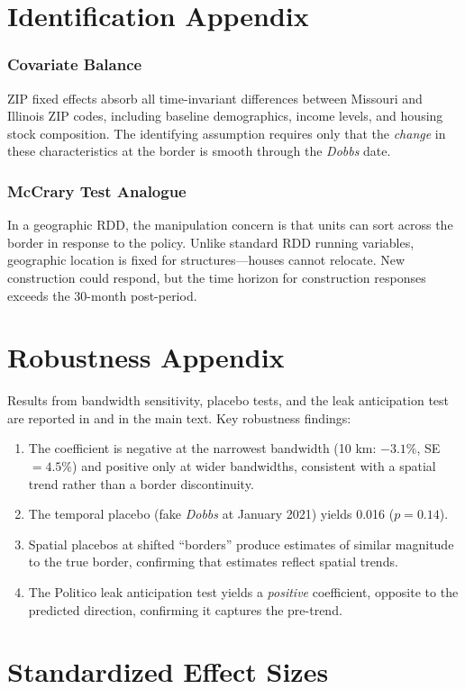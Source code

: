 \documentclass[12pt]{article}
\begin{document}
\section{Identification Appendix}
\label{app:identification}

\subsubsection*{Covariate Balance} ZIP fixed effects absorb all time-invariant differences between Missouri and Illinois ZIP codes, including baseline demographics, income levels, and housing stock composition. The identifying assumption requires only that the \textit{change} in these characteristics at the border is smooth through the \textit{Dobbs} date.

\subsubsection*{McCrary Test Analogue} In a geographic RDD, the manipulation concern is that units can sort across the border in response to the policy. Unlike standard RDD running variables, geographic location is fixed for structures---houses cannot relocate. New construction could respond, but the time horizon for construction responses exceeds the 30-month post-period.

\section{Robustness Appendix}

Results from bandwidth sensitivity, placebo tests, and the leak anticipation test are reported in  and  in the main text. Key robustness findings:

\begin{enumerate}
\item The coefficient is negative at the narrowest bandwidth (10 km: $-3.1\%$, SE $= 4.5\%$) and positive only at wider bandwidths, consistent with a spatial trend rather than a border discontinuity.
\item The temporal placebo (fake \textit{Dobbs} at January 2021) yields 0.016 ($p = 0.14$).
\item Spatial placebos at shifted ``borders'' produce estimates of similar magnitude to the true border, confirming that estimates reflect spatial trends.
\item The Politico leak anticipation test yields a \textit{positive} coefficient, opposite to the predicted direction, confirming it captures the pre-trend.
\end{enumerate}

\section{Standardized Effect Sizes}
\label{sec:sde}


\end{document}
